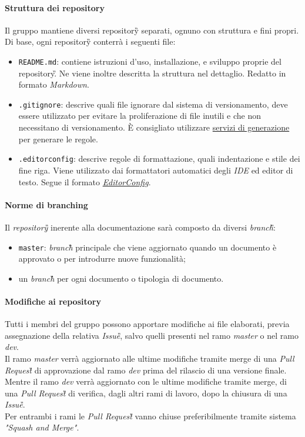 		\paragraph*{Struttura dei repository} %
		\aCapo{}  
		Il gruppo mantiene diversi repository\G{} separati, ognuno con struttura e fini propri.
		Di base, ogni repository\G{} conterrà i seguenti file:
		\begin{itemize}
			\item \verb#README.md#: contiene istruzioni d'uso, installazione, e sviluppo proprie del repository\G. Ne viene inoltre descritta la struttura nel dettaglio. Redatto in formato \textit{Markdown}.
			\item \verb#.gitignore#: descrive quali file ignorare dal sistema di versionamento, deve essere utilizzato per evitare la proliferazione di file inutili e che non necessitano di versionamento. È consigliato utilizzare \href{https://www.toptal.com/developers/gitignore}{servizi di generazione} per generare le regole.
			\item \verb#.editorconfig#: descrive regole di formattazione, quali indentazione e stile dei fine riga. Viene utilizzato dai formattatori automatici degli \textit{IDE} ed editor di testo. Segue il formato \href{https://editorconfig.org/}{\textit{EditorConfig}}.
		\end{itemize}

		\paragraph*{Norme di branching}
		\aCapo{}  
			Il \emph{repository\G{}} inerente alla documentazione sarà composto da diversi \textit{branch\G}:
			\begin{itemize}
				\item \verb#master#: \emph{branch}\G{} principale che viene aggiornato quando un documento è approvato o per introdurre nuove funzionalità; 
				\item un \textit{branch}\G{} per ogni documento o tipologia di documento.
			\end{itemize}
		
		\paragraph*{Modifiche ai repository}
		\aCapo{}  
		Tutti i membri del gruppo possono apportare modifiche ai file elaborati, previa assegnazione della relativa \textit{Issue\G{}}, salvo quelli presenti nel ramo \textit{master} o nel ramo \textit{dev}. \\
		 Il ramo \textit{master} verrà aggiornato alle ultime modifiche tramite merge di una \textit{Pull Request\G{}} di approvazione dal ramo \textit{dev} prima del rilascio di una versione finale.\\
		Mentre il ramo \textit{dev} verrà aggiornato con le ultime modifiche tramite merge, di una \textit{Pull Request\G{}} di verifica, dagli altri rami di lavoro, dopo la chiusura di una \textit{Issue\G{}}. \\
		Per entrambi i rami le \textit{Pull Request\G{}} vanno chiuse preferibilmente tramite sistema \textit{"Squash and Merge"}.
		
